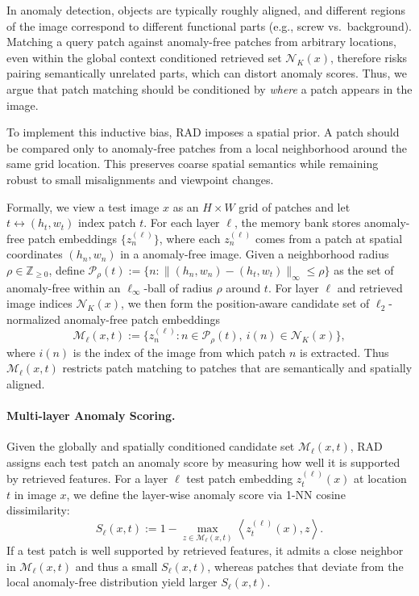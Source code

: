 \documentclass{article}
\theoremstyle{plain}
\theoremstyle{definition}
\theoremstyle{remark}
\begin{document}
In anomaly detection, objects are typically roughly aligned, and different regions of the image correspond to different functional parts (e.g., screw vs.\ background).
Matching a query patch against anomaly-free patches from arbitrary locations, even within the global context conditioned retrieved set $\mathcal{N}_K(x)$, therefore risks pairing semantically unrelated parts, which can distort anomaly scores. Thus, we argue that patch matching should be conditioned by \emph{where} a patch appears in the image.

To implement this inductive bias, RAD imposes a spatial prior. A patch should be compared only to anomaly-free patches from a local neighborhood around the same grid location.
This preserves coarse spatial semantics while remaining robust to small misalignments and viewpoint changes.


Formally, we view a test image $x$ as an $H \times W$ grid of patches and let
$t \leftrightarrow (h_t, w_t)$ index patch $t$.
For each layer $\ell$, the memory bank stores anomaly-free patch embeddings
$\{z^{(\ell)}_n\}$, where each $z^{(\ell)}_n$ comes from a patch at spatial
coordinates $(h_n, w_n)$ in a anomaly-free image.
Given a neighborhood radius $\rho \in \mathbb{Z}_{\ge 0}$, define $\mathcal{P}_\rho(t)
:=
\Big\{ n : \big\|(h_n, w_n) - (h_t, w_t)\big\|_\infty \le \rho \Big\}$ as the set of anomaly-free within an $\ell_\infty$-ball of radius $\rho$
around $t$.
For layer $\ell$ and retrieved image indices $\mathcal{N}_K(x)$, we then form
the position-aware candidate set of $\ell_2$-normalized anomaly-free patch embeddings
\begin{equation}
\label{eq:cand-set}
\mathcal{M}_\ell(x,t)
:=
\Big\{ z^{(\ell)}_{n} : n \in \mathcal{P}_\rho(t),\ i(n) \in \mathcal{N}_K(x) \Big\},
\end{equation}
where $i(n)$ is the index of the image from which patch $n$ is extracted.
Thus $\mathcal{M}_\ell(x,t)$ restricts patch matching to patches that are semantically and spatially aligned.


\paragraph{Multi-layer Anomaly Scoring.}
Given the globally and spatially conditioned candidate set $\mathcal{M}_\ell(x,t)$, RAD assigns each test patch an anomaly score by measuring how well it is supported by retrieved features.
For a layer $\ell$ test patch embedding $z^{(\ell)}_{t}(x)$ at location $t$ in image $x$, we define the layer-wise anomaly score via 1-NN cosine dissimilarity:
\begin{equation}
\label{eq:patch-energy-cos}
S_\ell(x,t)
:= 1 - \max_{z \in \mathcal{M}_\ell(x,t)}
\left\langle z^{(\ell)}_{t}(x), z \right\rangle.
\end{equation}
If a test patch is well supported by retrieved features, it admits a close neighbor in $\mathcal{M}_\ell(x,t)$ and thus a small $S_\ell(x,t)$, whereas patches that deviate from the local anomaly-free distribution yield larger $S_\ell(x,t)$.
\end{document}
